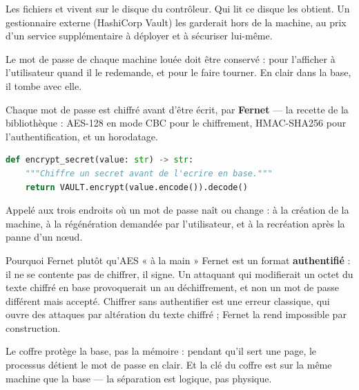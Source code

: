 \limite
Les fichiers  et  vivent sur le disque du
contrôleur. Qui lit ce disque les obtient. Un gestionnaire externe
(HashiCorp Vault) les garderait hors de la machine, au prix d'un service
supplémentaire à déployer et à sécuriser lui-même.


\menace
Le mot de passe  de chaque machine louée doit être conservé : pour
l'afficher à l'utilisateur quand il le redemande, et pour le faire tourner. En
clair dans la base, il tombe avec elle.

\parade
Chaque mot de passe est chiffré avant d'être écrit, par \textbf{Fernet} --- la
recette de la bibliothèque  : AES-128 en mode CBC pour le
chiffrement, HMAC-SHA256 pour l'authentification, et un horodatage.

\danslecode
\begin{lstlisting}[language=Python]
def encrypt_secret(value: str) -> str:
    """Chiffre un secret avant de l'ecrire en base."""
    return VAULT.encrypt(value.encode()).decode()
\end{lstlisting}

Appelé aux trois endroits où un mot de passe naît ou change : à la création de
la machine, à la régénération demandée par l'utilisateur, et à la recréation
après la panne d'un nœud.

\begin{notion}{Pourquoi Fernet plutôt qu'AES « à la main »}
Fernet est un format \textbf{authentifié} : il ne se contente pas de chiffrer,
il signe. Un attaquant qui modifierait un octet du texte chiffré en base
provoquerait un  au déchiffrement, et non un mot de passe
différent mais accepté. Chiffrer sans authentifier est une erreur classique,
qui ouvre des attaques par altération du texte chiffré ; Fernet la rend
impossible par construction.
\end{notion}

\limite
Le coffre protège la base, pas la mémoire : pendant qu'il sert une page, le
processus détient le mot de passe en clair. Et la clé du coffre est sur la même
machine que la base --- la séparation est logique, pas physique.


